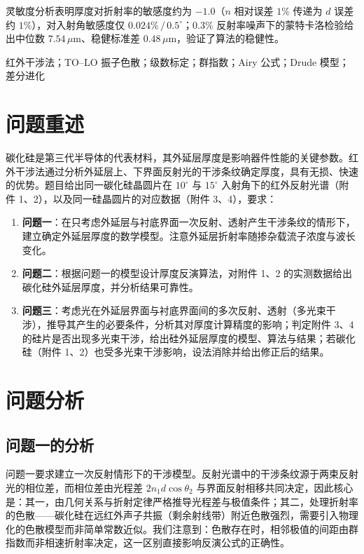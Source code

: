 \documentclass[11pt,a4paper,fontset=fandol]{ctexart}
\newcommand{\um}{\,\mu\mathrm{m}}
\begin{document}
灵敏度分析表明厚度对折射率的敏感度约为 $-1.0$（$n$ 相对误差 $1\%$ 传递为 $d$ 误差约 $1\%$），对入射角敏感度仅 $0.024\%\,/\,0.5^\circ$；$0.3\%$ 反射率噪声下的蒙特卡洛检验给出中位数 $7.54\um$、稳健标准差 $0.48\um$，验证了算法的稳健性。

\vspace{0.6em}
红外干涉法；TO--LO 振子色散；级数标定；群指数；Airy 公式；Drude 模型；\mbox{差分进化}

\newpage

\section{问题重述}

碳化硅是第三代半导体的代表材料，其外延层厚度是影响器件性能的关键参数。红外干涉法通过分析外延层上、下界面反射光的干涉条纹确定厚度，具有无损、快速的优势。题目给出同一碳化硅晶圆片在 $10^\circ$ 与 $15^\circ$ 入射角下的红外反射光谱（附件 1、2），以及同一硅晶圆片的对应数据（附件 3、4），要求：

\begin{enumerate}[label=（\arabic*）, leftmargin=2.4em, itemsep=0.1em]
    \item \textbf{问题一}：在只考虑外延层与衬底界面一次反射、透射产生干涉条纹的情形下，建立确定外延层厚度的数学模型。注意外延层折射率随掺杂载流子浓度与波长变化。
    \item \textbf{问题二}：根据问题一的模型设计厚度反演算法，对附件 1、2 的实测数据给出碳化硅外延层厚度，并分析结果可靠性。
    \item \textbf{问题三}：考虑光在外延层界面与衬底界面间的多次反射、透射（多光束干涉），推导其产生的必要条件，分析其对厚度计算精度的影响；判定附件 3、4 的硅片是否出现多光束干涉，给出硅外延层厚度的模型、算法与结果；若碳化硅（附件 1、2）也受多光束干涉影响，设法消除并给出修正后的结果。
\end{enumerate}

\section{问题分析}

\subsection{问题一的分析}
问题一要求建立一次反射情形下的干涉模型。反射光谱中的干涉条纹源于两束反射光的相位差，而相位差由光程差 $2n_1d\cos\theta_2$ 与界面反射相移共同决定，因此核心是：其一，由几何关系与折射定律严格推导光程差与极值条件；其二，处理折射率的色散——碳化硅在远红外声子共振（剩余射线带）附近色散强烈，需要引入物理化的色散模型而非简单常数近似。我们注意到：色散存在时，相邻极值的间距由群指数而非相速折射率决定，这一区别直接影响反演公式的正确性。
\end{document}
